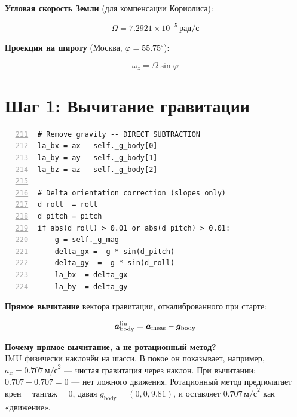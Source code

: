 \textbf{Угловая скорость Земли} (для компенсации Кориолиса):

\begin{equation}
  \Omega = 7.2921 \times 10^{-5}\,\text{рад/с}
  \label{eq:earth_omega}
\end{equation}

\textbf{Проекция на широту} (Москва, $\varphi = 55.75^\circ$):

\begin{equation}
  \omega_z = \Omega \sin\varphi
  \label{eq:omega_z}
\end{equation}

\section{Шаг 1: Вычитание гравитации}

\begin{filebox}[title={\filepath{accel\_position.py}, строки 211--225 --- update\_imu()}]
\begin{lstlisting}[style=pythonstyle, numbers=left, firstnumber=211]
# Remove gravity -- DIRECT SUBTRACTION
la_bx = ax - self._g_body[0]
la_by = ay - self._g_body[1]
la_bz = az - self._g_body[2]

# Delta orientation correction (slopes only)
d_roll  = roll
d_pitch = pitch
if abs(d_roll) > 0.01 or abs(d_pitch) > 0.01:
    g = self._g_mag
    delta_gx = -g * sin(d_pitch)
    delta_gy  =  g * sin(d_roll)
    la_bx -= delta_gx
    la_by -= delta_gy
\end{lstlisting}
\end{filebox}

\textbf{Прямое вычитание} вектора гравитации, откалиброванного при старте:

\begin{equation}
  \bm{a}^{\text{lin}}_{\text{body}} = \bm{a}_{\text{meas}} - \bm{g}_{\text{body}}
  \label{eq:gravity_subtract}
\end{equation}

\begin{notebox}
\textbf{Почему прямое вычитание, а не ротационный метод?}\\
IMU физически наклонён на шасси. В покое он показывает, например,
$a_x = 0.707\,\text{м/с}^2$ --- чистая гравитация через наклон.
При вычитании: $0.707 - 0.707 = 0$ --- нет ложного движения.
Ротационный метод предполагает $\text{крен}=\text{тангаж}=0$, давая $g_{\text{body}} = (0, 0, 9.81)$,
и оставляет $0.707\,\text{м/с}^2$ как «движение».
\end{notebox}

